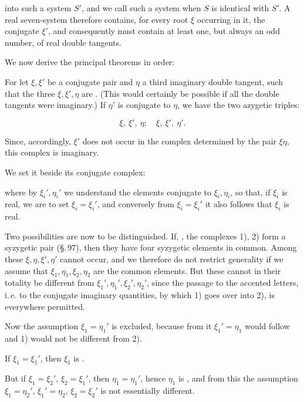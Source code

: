 
into such a system $S'$, and we call such a system
 when $S$ is identical with $S'$. A real seven-system
therefore contains, for every root $\xi$ occurring in it, the conjugate
$\xi'$, and consequently must contain at least one, but always an
odd number, of real double tangents.

We now derive the principal theorems in order:


For let $\xi, \xi'$ be a conjugate pair and $\eta$ a third
imaginary double tangent, such that the three $\xi, \xi', \eta$ are .
(This would certainly be possible if all the double tangents
were imaginary.) If $\eta'$ is conjugate to $\eta$, we have the two
azygetic triples:

\[
\xi,\ \xi',\ \eta;\quad \xi,\ \xi',\ \eta'.
\]

Since, accordingly, $\xi'$ does not occur in the 
complex determined by the pair $\xi\eta$, this complex is
imaginary.

We set it beside its conjugate complex:


where by $\xi_i', \eta_i'$ we understand the elements conjugate to $\xi_i, \eta_i$,
so that, if $\xi_i$ is real, we are to set $\xi_i = \xi_i'$, and conversely
from $\xi_i = \xi_i'$ it also follows that $\xi_i$ is real.

Two possibilities are now to be distinguished. If,
, the complexes 1), 2) form a syzygetic pair (\S.\,97),
then they have four syzygetic elements in common. Among these
$\xi, \eta, \xi', \eta'$ cannot occur, and we therefore do not restrict
generality if we assume that $\xi_1, \eta_1, \xi_2, \eta_2$ are
the common elements. But these cannot in their totality
be different from $\xi_1', \eta_1', \xi_2', \eta_2'$, since the
passage to the accented letters, i.\,e. to the conjugate
imaginary quantities, by which 1) goes over into 2), is everywhere
permitted.

Now the assumption $\xi_1 = \eta_1'$ is excluded, because from it
$\xi_1' = \eta_1$ would follow and 1) would not be different from 2).

If $\xi_1 = \xi_1'$, then $\xi_1$ is .

But if $\xi_1 = \xi_2'$, $\xi_2 = \xi_1'$,
then $\eta_1 = \eta_1'$, hence $\eta_1$ is ,
and from this the assumption $\xi_1 = \eta_2'$, $\xi_1' = \eta_2$, $\xi_2 = \xi_2'$ is not
essentially different.
